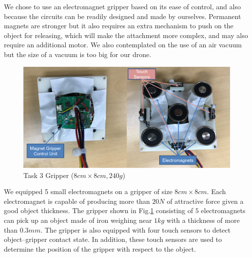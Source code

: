 \documentclass{standalone}
\begin{document}
We chose to use an electromagnet gripper based on its ease of control, and also because the circuits
can be readily designed and made by ourselves. Permanent magnets are stronger but it also
requires an extra mechanism to push on the object for releasing, which will
make the attachment more complex, and may also require an additional motor. We
also contemplated on the use of an air vacuum but the size of a vacuum is too
big for our drone.

 \begin{figure}[hb]
    \begin{center}
    \includegraphics[keepaspectratio=true, width=1\linewidth, height=0.3\textheight]
    {sections//task3//images//task3gripper.png}
      \end{center}
    \caption{Task 3 Gripper ($8cm \times 8cm, 240g$)}
    \label{task3platform}
    \end{figure}

We equipped 5 small electromagnets on a gripper of size $8cm \times
8cm$. Each electromagnet is capable of producing more than $20 N$
of attractive force given a good object thickness. The gripper shown in
Fig.\ref{task3platform} consisting of $5$
electromagnets can pick up an object made of iron weighing near $1kg$ with a thickness of more than $0.3mm$.
The gripper is also equipped with four touch sensors to detect
object--gripper contact state. In addition,
these touch sensors are used to determine the position of the gripper
with respect to the object. 

\end{document}
